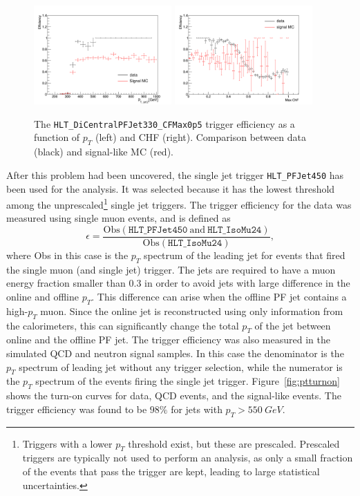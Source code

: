 \begin{figure}[ht]
  \centering
  \includegraphics[width=0.47\textwidth]{figures/trigger/pt_eff_05_DataSIMP.pdf}\hfill%
  \includegraphics[width=0.47\textwidth]{figures/trigger/chf_eff_05_DataSIMP.pdf}
  \caption{The \texttt{HLT\_DiCentralPFJet330\_CFMax0p5} trigger efficiency as a function of $p_{T}$ (left) and CHF (right). Comparison between data (black) and signal-like MC (red).}
  \label{fig:efficiencies_simp_data}
\end{figure}

After this problem had been uncovered, the single jet trigger \texttt{HLT\_PFJet450} has been used for the analysis. It was selected because it has the lowest threshold among the unprescaled\footnote{Triggers with a lower $p_T$ threshold exist, but these are prescaled. Prescaled triggers are typically not used to perform an analysis, as only a small fraction of the events that pass the trigger are kept, leading to large statistical uncertainties.} single jet triggers. The trigger efficiency for the data was measured using single muon events, and is defined as
\begin{equation}
\epsilon = \frac{\mathrm{Obs}(\texttt{HLT\_PFJet450}\ \mathrm{and}\ \texttt{HLT\_IsoMu24})}{\mathrm{Obs}(\texttt{HLT\_IsoMu24})},
\end{equation} 
where Obs in this case is the $p_T$ spectrum of the leading jet for events that fired the single muon (and single jet) trigger. The jets are required to have a muon energy fraction smaller than $0.3$ in order to avoid jets with large difference in the online and offline $p_T$. This difference can arise when the offline \ac{PF} jet contains a high-$p_T$ muon. Since the online jet is reconstructed using only information from the calorimeters, this can significantly change the total $p_T$ of the jet between online and the offline \ac{PF} jet. The trigger efficiency was also measured in the simulated \ac{QCD} and neutron signal samples. In this case the denominator is the $p_T$ spectrum of leading jet without any trigger selection, while the numerator is the $p_T$ spectrum of the events firing the single jet trigger. Figure~\ref{fig:ptturnon} shows the turn-on curves for data, \ac{QCD} events, and the signal-like events. The trigger efficiency was found to be $98\%$ for jets with $p_{T}>\SI{550}{GeV}$.

